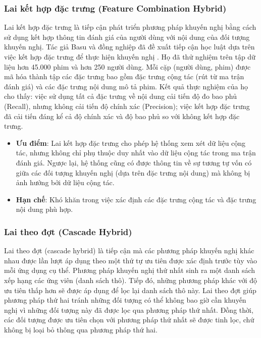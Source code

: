 \subsubsection{Lai kết hợp đặc trưng (Feature Combination Hybrid)}
Lai kết hợp đặc trưng là tiếp cận phát triển phương pháp khuyến nghị bằng cách sử dụng kết hợp thông tin đánh giá của người dùng với nội dung của đối tượng khuyến nghị. Tác giả Basu và đồng nghiệp đã đề xuất tiếp cận học luật dựa trên việc kết hợp đặc trưng để thực hiện khuyến nghị \cite{Basu98recommendationas}. Họ đã thử nghiệm trên tập dữ liệu hơn 45.000 phim và hơn 250 người dùng. Mỗi cặp (người dùng, phim) được mã hóa thành tập các đặc trưng bao gồm đặc trưng cộng tác (rút từ ma trận đánh giá) và các đặc trưng nội dung mô tả phim. Kết quả thực nghiệm của họ cho thấy: việc sử dụng tất cả đặc trưng về nội dung cải tiến độ đo bao phủ (Recall), nhưng không cải tiến độ chính xác (Precision); việc kết hợp đặc trưng đã cải tiến đáng kể cả độ chính xác và độ bao phủ so với không kết hợp đặc trưng.

\begin{itemize}
	\item \textbf{Ưu điểm}: Lai kết hợp đặc trưng cho phép hệ thống xem xét dữ liệu cộng tác, nhưng không chỉ phụ thuộc duy nhất vào dữ liệu cộng tác trong ma trận đánh giá. Ngược lại, hệ thống cũng có được thông tin về sự tương tự vốn có giữa các đối tượng khuyến nghị (dựa trên đặc trưng nội dung) mà không bị ảnh hưởng bởi dữ liệu cộng tác.
\end{itemize}
\begin{itemize}
	\item \textbf{Hạn chế}: Khó khăn trong việc xác định các đặc trưng cộng tác và đặc trưng nội dung phù hợp.
\end{itemize}

\subsubsection{Lai theo đợt (Cascade Hybrid)}
Lai theo đợt (cascade hybrid) là tiếp cận mà các phương pháp khuyến nghị khác nhau được lần lượt áp dụng theo một thứ tự ưu tiên được xác định trước tùy vào mỗi ứng dụng cụ thể. Phương pháp khuyến nghị thứ nhất sinh ra một danh sách xếp hạng các ứng viên (danh sách thô). Tiếp đó, những phương pháp khác với độ ưu tiên thấp hơn sẽ được áp dụng để lọc lại danh sách thô này. Lai theo đợt giúp phương pháp thứ hai tránh những đối tượng có thể không bao giờ cần khuyến nghị vì những đối tượng này đã được lọc qua phương pháp thứ nhất. Đồng thời, các đối tượng được ưu tiên chọn với phương pháp thứ nhất sẽ được tinh lọc, chứ không bị loại bỏ thông qua phương pháp thứ hai. 

